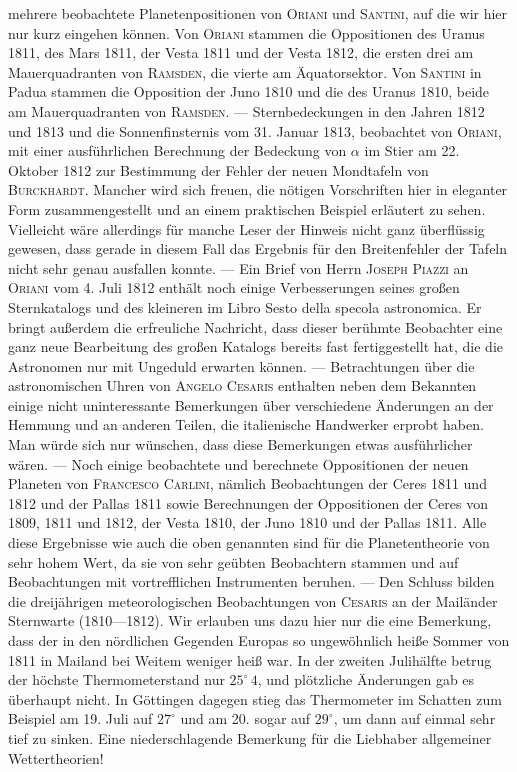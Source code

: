 mehrere beobachtete Planetenpositionen von \textsc{Oriani} und \textsc{Santini}, auf die wir hier nur kurz eingehen können. Von \textsc{Oriani} stammen die Oppositionen des Uranus 1811, des Mars 1811, der Vesta 1811 und der Vesta 1812, die ersten drei am Mauerquadranten von \textsc{Ramsden}, die vierte am Äquatorsektor. Von \textsc{Santini} in Padua stammen die Opposition der Juno 1810 und die des Uranus 1810, beide am Mauerquadranten von \textsc{Ramsden}. --- Sternbedeckungen in den Jahren 1812 und 1813 und die Sonnenfinsternis vom 31. Januar 1813, beobachtet von \textsc{Oriani}, mit einer ausführlichen Berechnung der Bedeckung von $\alpha$ im Stier am 22. Oktober 1812 zur Bestimmung der Fehler der neuen Mondtafeln von \textsc{Burckhardt}. Mancher wird sich freuen, die nötigen Vorschriften hier in eleganter Form zusammengestellt und an einem praktischen Beispiel erläutert zu sehen. Vielleicht wäre allerdings für manche Leser der Hinweis nicht ganz überflüssig gewesen, dass gerade in diesem Fall das Ergebnis für den Breitenfehler der Tafeln nicht sehr genau ausfallen konnte. --- Ein Brief von Herrn \textsc{Joseph Piazzi} an \textsc{Oriani} vom 4. Juli 1812 enthält noch einige Verbesserungen seines großen Sternkatalogs und des kleineren im Libro Sesto della specola astronomica. Er bringt außerdem die erfreuliche Nachricht, dass dieser berühmte Beobachter eine ganz neue Bearbeitung des großen Katalogs bereits fast fertiggestellt hat, die die Astronomen nur mit Ungeduld erwarten können. --- Betrachtungen über die astronomischen Uhren von \textsc{Angelo Cesaris} enthalten neben dem Bekannten einige nicht uninteressante Bemerkungen über verschiedene Änderungen an der Hemmung und an anderen Teilen, die italienische Handwerker erprobt haben. Man würde sich nur wünschen, dass diese Bemerkungen etwas ausführlicher wären. --- Noch einige beobachtete und berechnete Oppositionen der neuen Planeten von \textsc{Francesco Carlini}, nämlich Beobachtungen der Ceres 1811 und 1812 und der Pallas 1811 sowie Berechnungen der Oppositionen der Ceres von 1809, 1811 und 1812, der Vesta 1810, der Juno 1810 und der Pallas 1811. Alle diese Ergebnisse wie auch die oben genannten sind für die Planetentheorie von sehr hohem Wert, da sie von sehr geübten Beobachtern stammen und auf Beobachtungen mit vortrefflichen Instrumenten beruhen. --- Den Schluss bilden die dreijährigen meteorologischen Beobachtungen von \textsc{Cesaris} an der Mailänder Sternwarte (1810---1812). Wir erlauben uns dazu hier nur die eine Bemerkung, dass der in den nördlichen Gegenden Europas so ungewöhnlich heiße Sommer von 1811 in Mailand bei Weitem weniger heiß war. In der zweiten Julihälfte betrug der höchste Thermometerstand nur $25^\circ\,4$, und plötzliche Änderungen gab es überhaupt nicht. In Göttingen dagegen stieg das Thermometer im Schatten zum Beispiel am 19. Juli auf $27^\circ$ und am 20. sogar auf $29^\circ$, um dann auf einmal sehr tief zu sinken. Eine niederschlagende Bemerkung für die Liebhaber allgemeiner Wettertheorien!
